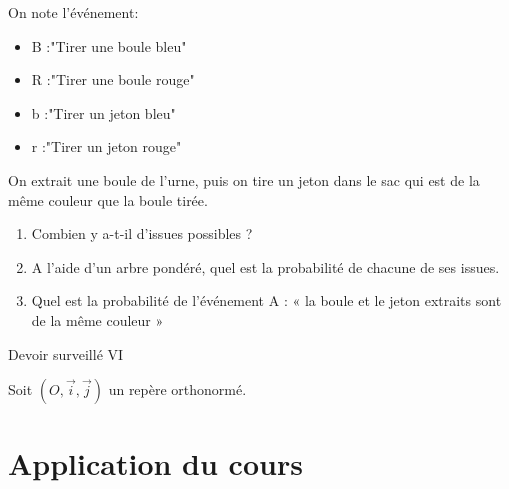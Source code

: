 \documentclass[french]{book}
\begin{document}
On note l'événement:
\begin{itemize}
\item B :"Tirer une boule bleu"
\item R :"Tirer une boule rouge"
\item b :"Tirer un jeton bleu"
\item r :"Tirer un jeton rouge"\\
\end{itemize}

On extrait une boule de l'urne, puis on tire un jeton dans le sac qui est de la même couleur que la boule tirée.

\begin{enumerate}
\item Combien y a-t-il d’issues possibles ?
\item A l'aide d’un arbre pondéré, quel est la probabilité de chacune de ses issues.
\item Quel est la probabilité de l'événement A : « la boule et le jeton extraits sont de la même
couleur »
\end{enumerate}


\newpage


\begin{center}
\huge{ Devoir surveillé VI}
\end{center}
 
\vspace{1cm}
\pagestyle{empty}

Soit $(O,\overrightarrow{i},\overrightarrow{j})$ un repère orthonormé.

\section*{Application du cours}
\end{document}
